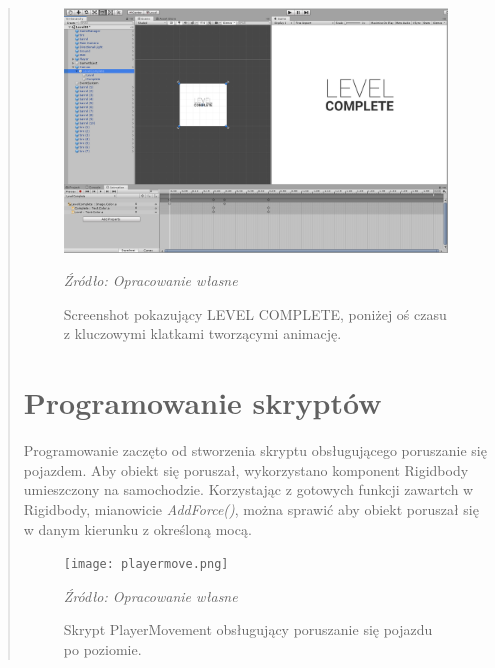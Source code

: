 \begin{quotation}
\begin{figure}[!h]
\centering
  \includegraphics[width=0.75\linewidth]{levelcomplete2.png}
  \caption{Screenshot pokazujący LEVEL COMPLETE, poniżej oś czasu z kluczowymi klatkami tworzącymi animację.}\label{rys_3}
  \begin{minipage}[t]{0.75\linewidth}
    \emph{Źródło: Opracowanie własne}
  \end{minipage}
\end{figure}

\newpage
\section{Programowanie skryptów}
\indent Programowanie zaczęto od stworzenia skryptu obsługującego poruszanie się pojazdem. Aby obiekt się poruszał, wykorzystano komponent Rigidbody umieszczony na samochodzie. Korzystając z gotowych funkcji zawartch w Rigidbody, mianowicie \textit{AddForce()}, można sprawić aby obiekt poruszał się w danym kierunku z określoną mocą.

\begin{figure}[!h]
\centering
  \texttt{[image: playermove.png]}
  \caption{Skrypt PlayerMovement obsługujący poruszanie się pojazdu po poziomie.}\label{rys_4}
  \begin{minipage}[t]{0.75\linewidth}
    \emph{Źródło: Opracowanie własne}
  \end{minipage}
\end{figure}


\end{quotation}

